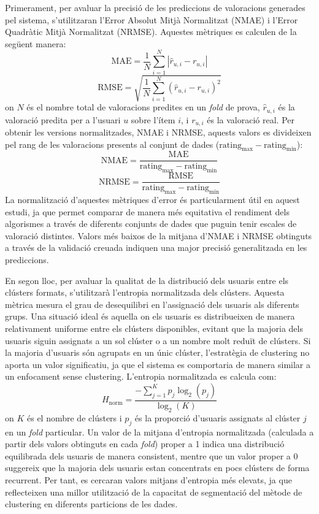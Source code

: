 \documentclass[a4paper,12pt]{report}
\begin{document}
Primerament, per avaluar la precisió de les prediccions de valoracions generades pel sistema, s'utilitzaran l'Error Absolut Mitjà Normalitzat (NMAE) i l'Error Quadràtic Mitjà Normalitzat (NRMSE). Aquestes mètriques es calculen de la següent manera:
\[
\text{MAE} = \frac{1}{N} \sum_{i=1}^{N} | \hat{r}_{u,i} - r_{u,i} |
\]
\[
\text{RMSE} = \sqrt{\frac{1}{N} \sum_{i=1}^{N} (\hat{r}_{u,i} - r_{u,i})^2}
\]
on \(N\) és el nombre total de valoracions predites en un \textit{fold} de prova, \( \hat{r}_{u,i} \) és la valoració predita per a l'usuari \(u\) sobre l'ítem \(i\), i \( r_{u,i} \) és la valoració real.
Per obtenir les versions normalitzades, NMAE i NRMSE, aquests valors es divideixen pel rang de les valoracions presents al conjunt de dades (\( \text{rating}_{\text{max}} - \text{rating}_{\text{min}} \)):
\[
\text{NMAE} = \frac{\text{MAE}}{\text{rating}_{\text{max}} - \text{rating}_{\text{min}}}
\]
\[
\text{NRMSE} = \frac{\text{RMSE}}{\text{rating}_{\text{max}} - \text{rating}_{\text{min}}}
\]
La normalització d'aquestes mètriques d'error és particularment útil en aquest estudi, ja que permet comparar de manera més equitativa el rendiment dels algorismes a través de diferents conjunts de dades que puguin tenir escales de valoració distintes. Valors més baixos de la mitjana d'NMAE i NRMSE obtinguts a través de la validació creuada indiquen una major precisió generalitzada en les prediccions.

En segon lloc, per avaluar la qualitat de la distribució dels usuaris entre els clústers formats, s'utilitzarà l'entropia normalitzada dels clústers. Aquesta mètrica mesura el grau de desequilibri en l'assignació dels usuaris als diferents grups. Una situació ideal és aquella on els usuaris es distribueixen de manera relativament uniforme entre els clústers disponibles, evitant que la majoria dels usuaris siguin assignats a un sol clúster o a un nombre molt reduït de clústers. Si la majoria d'usuaris són agrupats en un únic clúster, l'estratègia de clustering no aporta un valor significatiu, ja que el sistema es comportaria de manera similar a un enfocament sense clustering. L'entropia normalitzada es calcula com:
\[
H_{\text{norm}} = \frac{-\sum_{j=1}^{K} p_j \log_2(p_j)}{\log_2(K)}
\]
on \(K\) és el nombre de clústers i \(p_j\) és la proporció d'usuaris assignats al clúster \(j\) en un \textit{fold} particular. Un valor de la mitjana d'entropia normalitzada (calculada a partir dels valors obtinguts en cada \textit{fold}) proper a 1 indica una distribució equilibrada dels usuaris de manera consistent, mentre que un valor proper a 0 suggereix que la majoria dels usuaris estan concentrats en pocs clústers de forma recurrent. Per tant, es cercaran valors mitjans d'entropia més elevats, ja que reflecteixen una millor utilització de la capacitat de segmentació del mètode de clustering en diferents particions de les dades.

\printbibliography[heading=bibintoc]
\end{document}
